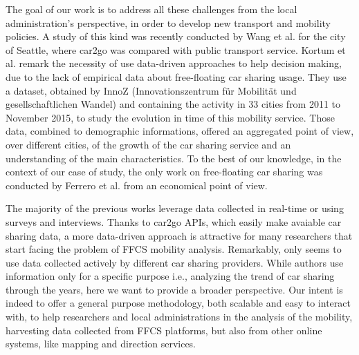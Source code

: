 The goal of our work is to address all these challenges from the local administration's perspective, in order to develop new transport and mobility policies.
A study of this kind was recently conducted by Wang et al. \cite{Wang2017} for the city of Seattle, where car2go was compared with public transport service.
Kortum et al. \cite{Kortum2016} remark the necessity of use data-driven approaches to help decision making, due to the lack of empirical data about free-floating car sharing usage. 
They use a dataset, obtained by InnoZ (Innovationszentrum für Mobilität und gesellschaftlichen Wandel) and containing the activity in 33 cities from 2011 to November 2015, to study the evolution in time of this mobility service. Those data, combined to demographic informations, offered an aggregated point of view, over different cities, of the growth of the car sharing service and an understanding of the main characteristics.
To the best of our knowledge, in the context of our case of study, the only work on free-floating car sharing was conducted by Ferrero et al. \cite{Ferrero2016} from an economical point of view.

The majority of the previous works \cite{Herrmann2014,Schulte2015,Wagner2015,Schmoller2015,Kopp2015,Wang2017,Kortum2016} leverage data collected in real-time or using surveys and interviews. Thanks to car2go APIs, which easily make avaiable car sharing data, a more data-driven approach is attractive for many researchers that start facing the problem of FFCS mobility analysis. Remarkably, only \cite{Kortum2016} seems to use data collected actively by different car sharing providers. While authors use information only for a specific purpose i.e., analyzing the trend of car sharing through the years, here we want to provide a broader perspective.
Our intent is indeed to offer a general purpose methodology, both scalable and easy to interact with, to help researchers and local administrations in the analysis of the mobility, harvesting data collected from FFCS platforms, but also from other online systems, like mapping and direction services. 
